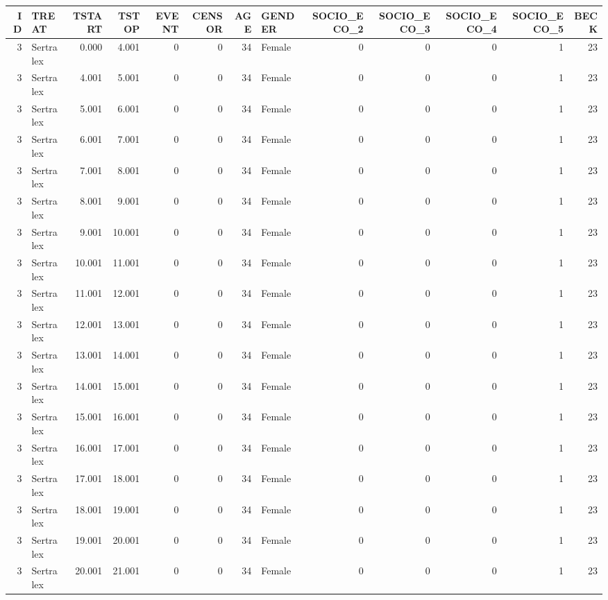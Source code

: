\documentclass[
]{book}
\begin{document}
\begin{table}
\centering\begingroup\fontsize{12}{14}\selectfont

\begin{tabular}[t]{r|l|r|r|r|r|r|l|r|r|r|r|r}
\hline
ID & TREAT & TSTART & TSTOP & EVENT & CENSOR & AGE & GENDER & SOCIO\_ECO\_2 & SOCIO\_ECO\_3 & SOCIO\_ECO\_4 & SOCIO\_ECO\_5 & BECK\\
\hline
3 & Sertralex & 0.000 & 4.001 & 0 & 0 & 34 & Female & 0 & 0 & 0 & 1 & 23\\
\hline
3 & Sertralex & 4.001 & 5.001 & 0 & 0 & 34 & Female & 0 & 0 & 0 & 1 & 23\\
\hline
3 & Sertralex & 5.001 & 6.001 & 0 & 0 & 34 & Female & 0 & 0 & 0 & 1 & 23\\
\hline
3 & Sertralex & 6.001 & 7.001 & 0 & 0 & 34 & Female & 0 & 0 & 0 & 1 & 23\\
\hline
3 & Sertralex & 7.001 & 8.001 & 0 & 0 & 34 & Female & 0 & 0 & 0 & 1 & 23\\
\hline
3 & Sertralex & 8.001 & 9.001 & 0 & 0 & 34 & Female & 0 & 0 & 0 & 1 & 23\\
\hline
3 & Sertralex & 9.001 & 10.001 & 0 & 0 & 34 & Female & 0 & 0 & 0 & 1 & 23\\
\hline
3 & Sertralex & 10.001 & 11.001 & 0 & 0 & 34 & Female & 0 & 0 & 0 & 1 & 23\\
\hline
3 & Sertralex & 11.001 & 12.001 & 0 & 0 & 34 & Female & 0 & 0 & 0 & 1 & 23\\
\hline
3 & Sertralex & 12.001 & 13.001 & 0 & 0 & 34 & Female & 0 & 0 & 0 & 1 & 23\\
\hline
3 & Sertralex & 13.001 & 14.001 & 0 & 0 & 34 & Female & 0 & 0 & 0 & 1 & 23\\
\hline
3 & Sertralex & 14.001 & 15.001 & 0 & 0 & 34 & Female & 0 & 0 & 0 & 1 & 23\\
\hline
3 & Sertralex & 15.001 & 16.001 & 0 & 0 & 34 & Female & 0 & 0 & 0 & 1 & 23\\
\hline
3 & Sertralex & 16.001 & 17.001 & 0 & 0 & 34 & Female & 0 & 0 & 0 & 1 & 23\\
\hline
3 & Sertralex & 17.001 & 18.001 & 0 & 0 & 34 & Female & 0 & 0 & 0 & 1 & 23\\
\hline
3 & Sertralex & 18.001 & 19.001 & 0 & 0 & 34 & Female & 0 & 0 & 0 & 1 & 23\\
\hline
3 & Sertralex & 19.001 & 20.001 & 0 & 0 & 34 & Female & 0 & 0 & 0 & 1 & 23\\
\hline
3 & Sertralex & 20.001 & 21.001 & 0 & 0 & 34 & Female & 0 & 0 & 0 & 1 & 23\\

\end{tabular}
\end{table}
\end{document}
